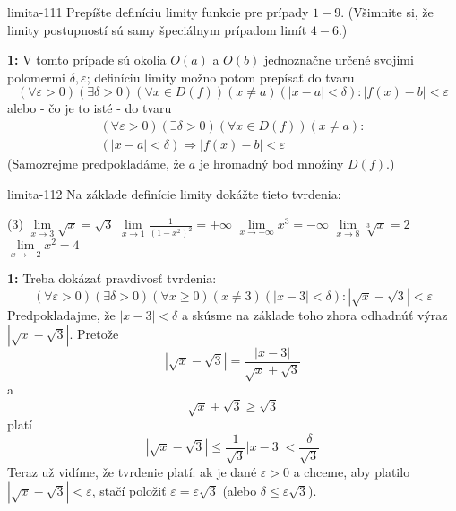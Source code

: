 \begin{defproblem}{limita-111}
Prepíšte definíciu limity funkcie pre prípady $1-9$. (Všimnite si, že limity
postupností sú samy špeciálnym prípadom limít $4-6$.)

\begin{solution}
    \textbf{1:}
    V tomto prípade sú okolia $O(a)$ a $O(b)$ jednoznačne určené svojimi
    polomermi $\delta,\varepsilon$; definíciu limity možno potom prepísať do tvaru
    \[
        (\forall \varepsilon > 0)
            (\exists \delta > 0)
                (\forall x \in D(f))
                    (x \neq a)(|x-a| < \delta):
                        |f(x)-b|<\varepsilon
    \]
    alebo - čo je to isté - do tvaru
    \begin{multline*}
        (\forall \varepsilon > 0)
            (\exists \delta > 0)
                (\forall x \in D(f))
                    (x \neq a): \\
                        (|x-a| < \delta) \Rightarrow |f(x)-b| < \varepsilon
    \end{multline*}
    (Samozrejme predpokladáme, že $a$ je hromadný bod množiny $D(f)$.)
\end{solution}
\end{defproblem}

\begin{defproblem}{limita-112}
Na základe definície limity dokážte tieto tvrdenia:
\begin{tasks}(3)
\task $\lim\limits_{x \rightarrow 3} \sqrt{x} = \sqrt{3}$
\task $\lim\limits_{x \rightarrow 1} \frac{1}{(1-x^2)^2} = +\infty$
\task $\lim\limits_{x \rightarrow -\infty}x^3 = -\infty$
\task $\lim\limits_{x \rightarrow 8} \sqrt[3]{x} = 2$
\task $\lim\limits_{x \rightarrow -2} x^2 = 4$
\end{tasks}

\begin{solution}
    \textbf{1:}
    Treba dokázať pravdivosť tvrdenia:
    \[
        (\forall \varepsilon > 0)
            (\exists \delta > 0)
                (\forall x \geq 0)
                    (x \neq 3)
                    (|x - 3| < \delta):
                    |\sqrt{x} - \sqrt{3}| < \varepsilon
    \]
    Predpokladajme, že $|x - 3| < \delta$ a skúsme na základe toho zhora
    odhadnúť výraz $|\sqrt{x} - \sqrt{3}|$. Pretože
    \[
        |\sqrt{x} - \sqrt{3}| = \frac{|x - 3|}{\sqrt{x} + \sqrt{3}}
    \]
    a
    \[
        \sqrt{x} + \sqrt{3} \geq \sqrt{3}
    \]
    platí
    \[
        |\sqrt{x} - \sqrt{3}| \leq \frac{1}{\sqrt{3}} |x - 3| < \frac{\delta}{\sqrt{3}}
    \]
    Teraz už vidíme, že tvrdenie platí: ak je dané $\varepsilon > 0$ a chceme,
    aby platilo $|\sqrt{x} - \sqrt{3}| < \varepsilon$, stačí položiť
    $\varepsilon = \varepsilon \sqrt{3}$ (alebo $\delta \leq \varepsilon
    \sqrt{3}$).
\end{solution}
\end{defproblem}

